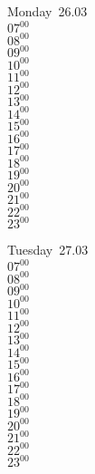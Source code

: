 \documentclass[11pt, a4paper]{book}\usepackage[]{graphicx}\usepackage[]{color}
\begin{document}
\begin{headerbox}
\end{headerbox}
\begin{weekdaybox}
  Monday~26.03\\
  { 
  \vfill
  $07^{00}$\\
$08^{00}$\\
$09^{00}$\\
$10^{00}$\\
$11^{00}$\\
$12^{00}$\\
$13^{00}$\\
$14^{00}$\\
$15^{00}$\\
$16^{00}$\\
$17^{00}$\\
$18^{00}$\\
$19^{00}$\\
$20^{00}$\\
$21^{00}$\\
$22^{00}$\\
$23^{00}$\\
  }
\end{weekdaybox}
\begin{weekdaybox}
  Tuesday~27.03\\
  { 
  \vfill
  $07^{00}$\\
$08^{00}$\\
$09^{00}$\\
$10^{00}$\\
$11^{00}$\\
$12^{00}$\\
$13^{00}$\\
$14^{00}$\\
$15^{00}$\\
$16^{00}$\\
$17^{00}$\\
$18^{00}$\\
$19^{00}$\\
$20^{00}$\\
$21^{00}$\\
$22^{00}$\\
$23^{00}$\\
  }
\end{weekdaybox}
\end{document}
